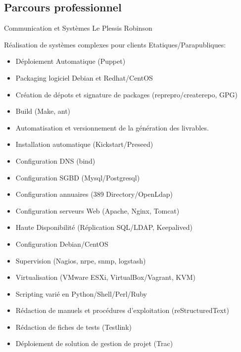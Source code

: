 \documentclass[10pt,a4paper]{moderncv}
\begin{document}
\subsection{Parcours professionnel}

              {Communication et Systèmes}
              {Le Plessis Robinson}
              {}
              {Réalisation de systèmes complexes pour clients Etatiques/Parapubliques:
                \begin{itemize}
                \item Déploiement Automatique (Puppet)
                \item Packaging logiciel Debian et Redhat/CentOS
                \item Création de dépots et signature de packages (reprepro/createrepo, GPG)
                \item Build (Make, ant)
                \item Automatisation et versionnement de la génération des livrables.
                \item Installation automatique (Kickstart/Preseed)
                \item Configuration DNS (bind)
                \item Configuration SGBD (Mysql/Postgresql)
                \item Configuration annuaires (389 Directory/OpenLdap)
                \item Configuration serveurs Web (Apache, Nginx, Tomcat)
                \item Haute Disponibilité (Réplication SQL/LDAP, Keepalived)
                \item Configuration Debian/CentOS
                \item Supervision (Nagios, nrpe, snmp, logstash)
                \item Virtualisation (VMware ESXi, VirtualBox/Vagrant, KVM)
                \item Scripting varié en Python/Shell/Perl/Ruby
                \item Rédaction de manuels et procédures d'exploitation (reStructuredText)
                \item Rédaction de fiches de tests (Testlink)
                \item Déploiement de solution de gestion de projet (Trac)
                \end{itemize}
              }
\end{document}
